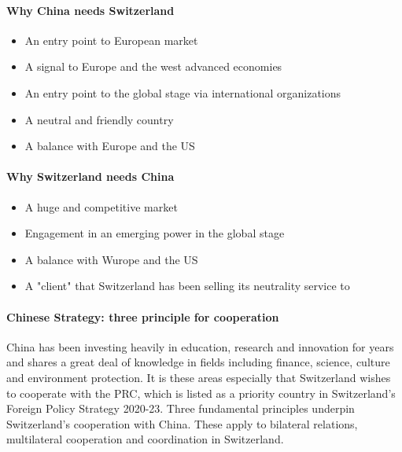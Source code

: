 \paragraph{Why China needs Switzerland}

\begin{itemize}
    \item An entry point to European market
    \item A signal to Europe and the west advanced economies
    \item An entry point to the global stage via international organizations
    \item A neutral and friendly country
    \item A balance with Europe and the US
\end{itemize}


\paragraph{Why Switzerland needs China}

\begin{itemize}
    \item A huge and competitive market
    \item Engagement in an emerging power in the global stage
    \item A balance with Wurope and the US
    \item A "client" that Switzerland has been selling its neutrality service to
\end{itemize}

\paragraph{Chinese Strategy: three principle for cooperation}

China has been investing heavily in education, research and innovation for years
and shares a great deal of knowledge in fields including finance, science,
culture and environment protection. It is these areas especially that Switzerland
wishes to cooperate with the PRC, which is listed as a priority country in
Switzerland's Foreign Policy Strategy 2020-23. Three fundamental principles
underpin Switzerland's cooperation with China. These apply to bilateral relations,
multilateral cooperation and coordination in Switzerland.

